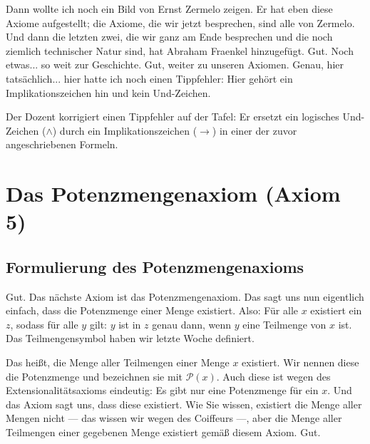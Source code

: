 \begin{spoken-clean}[00:41:07 - 00:41:37]
Dann wollte ich noch ein Bild von Ernst Zermelo zeigen. Er hat eben diese Axiome aufgestellt; die Axiome, die wir jetzt besprechen, sind alle von Zermelo. Und dann die letzten zwei, die wir ganz am Ende besprechen und die noch ziemlich technischer Natur sind, hat Abraham Fraenkel hinzugefügt. Gut. Noch etwas... so weit zur Geschichte. Gut, weiter zu unseren Axiomen. Genau, hier tatsächlich... hier hatte ich noch einen Tippfehler: Hier gehört ein Implikationszeichen hin und kein Und-Zeichen.
\end{spoken-clean}

\begin{meta-note}[Tafelkorrektur]
Der Dozent korrigiert einen Tippfehler auf der Tafel: Er ersetzt ein logisches Und-Zeichen ($\land$) durch ein Implikationszeichen ($\rightarrow$) in einer der zuvor angeschriebenen Formeln.
\end{meta-note}

\section{Das Potenzmengenaxiom (Axiom 5)}

\subsection{Formulierung des Potenzmengenaxioms}
\begin{spoken-clean}[00:41:37 - 00:43:31]
Gut. Das nächste Axiom ist das Potenzmengenaxiom. Das sagt uns nun eigentlich einfach, dass die Potenzmenge einer Menge existiert. Also: Für alle $x$ existiert ein $z$, sodass für alle $y$ gilt: $y$ ist in $z$ genau dann, wenn $y$ eine Teilmenge von $x$ ist. Das Teilmengensymbol haben wir letzte Woche definiert.

Das heißt, die Menge aller Teilmengen einer Menge $x$ existiert. Wir nennen diese die Potenzmenge und bezeichnen sie mit $\mathcal{P}(x)$. Auch diese ist wegen des Extensionalitätsaxioms eindeutig: Es gibt nur eine Potenzmenge für ein $x$. Und das Axiom sagt uns, dass diese existiert. Wie Sie wissen, existiert die Menge aller Mengen nicht --- das wissen wir wegen des Coiffeurs ---, aber die Menge aller Teilmengen einer gegebenen Menge existiert gemäß diesem Axiom. Gut.
\end{spoken-clean}

